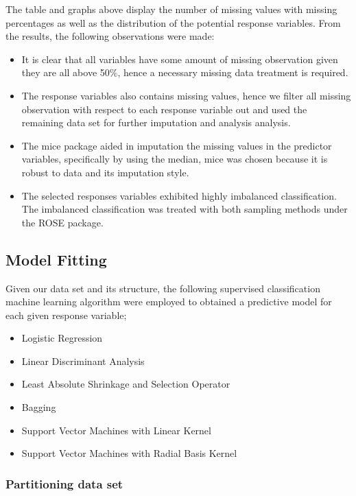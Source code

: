 \documentclass[
  10pt,
]{article}
\begin{document}
The table and graphs above display the number of missing values with missing percentages as well as the distribution of the potential response variables. From the results, the following observations were made:

\begin{itemize}
\item
  It is clear that all variables have some amount of missing observation given they are all above 50\%, hence a necessary missing data treatment is required.
\item
  The response variables also contains missing values, hence we filter all missing observation with respect to each response variable out and used the remaining data set for further imputation and analysis analysis.
\item
  The mice package aided in imputation the missing values in the predictor variables, specifically by using the median, mice was chosen because it is robust to data and its imputation style.
\item
  The selected responses variables exhibited highly imbalanced classification. The imbalanced classification was treated with both sampling methods under the ROSE package.
\end{itemize}

\hypertarget{model-fitting}{%
\subsection{Model Fitting}\label{model-fitting}}

Given our data set and its structure, the following supervised classification machine learning algorithm were employed to obtained a predictive model for each given response variable;

\begin{itemize}
\item
  Logistic Regression
\item
  Linear Discriminant Analysis
\item
  Least Absolute Shrinkage and Selection Operator
\item
  Bagging
\item
  Support Vector Machines with Linear Kernel
\item
  Support Vector Machines with Radial Basis Kernel
\end{itemize}

\hypertarget{partitioning-data-set}{%
\subsubsection{Partitioning data set}\label{partitioning-data-set}}
\end{document}
